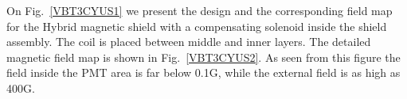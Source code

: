 \documentclass[12pt]{article}
\begin{document}

On Fig.~\ref{VBT3CYUS1} we present the  design and the corresponding field map  
for the Hybrid magnetic shield with a compensating solenoid inside the shield assembly. 
The coil is placed between  middle and  inner layers. The detailed magnetic field map  is 
shown in Fig.~\ref{VBT3CYUS2}.
As seen from this figure the field inside the PMT area is far below  0.1G,  
while the  external field is as high as 400G. 
% 
\end{document}
